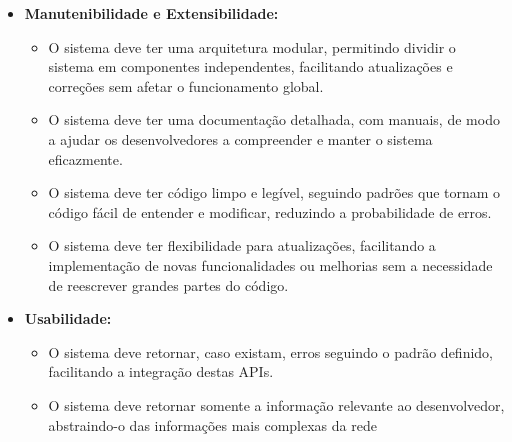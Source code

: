 \begin{itemize}
	\item \textbf{Manutenibilidade e Extensibilidade:} \begin{itemize} \item O
		            sistema deve ter uma arquitetura modular, permitindo dividir o sistema em
		            componentes independentes, facilitando atualizações e correções sem afetar
		            o funcionamento global. \item O sistema deve ter uma documentação
		            detalhada, com manuais, de modo a ajudar os desenvolvedores a compreender e
		            manter o sistema eficazmente. \item O sistema deve ter código limpo e
		            legível, seguindo padrões que tornam o código fácil de entender e
		            modificar, reduzindo a probabilidade de erros. \item O sistema deve ter
		            flexibilidade para atualizações, facilitando a implementação de novas
		            funcionalidades ou melhorias sem a necessidade de reescrever grandes partes do
		            código. \end{itemize} \item \textbf{Usabilidade:} \begin{itemize} \item O
		            sistema deve retornar, caso existam, erros seguindo o padrão definido,
		            facilitando a integração destas APIs. \item O sistema deve retornar somente a
		            informação relevante ao desenvolvedor, abstraindo-o das informações mais
		            complexas da rede \end{itemize} \end{itemize}
